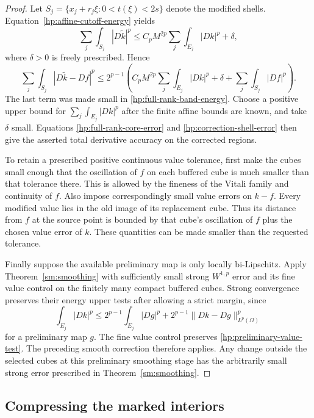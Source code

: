 \begin{proof}
Let $S_j=\{x_j+r_j\xi:0<t(\xi)<2s\}$ denote the modified shells.
Equation~\eqref{hp:affine-cutoff-energy} yields
\[
 \sum_j\int_{S_j}|D\widetilde k|^p
 \leq C_pM^{2p}\sum_j\int_{E_j}|Dk|^p+\delta,
\]
where $\delta>0$ is freely prescribed.  Hence
\begin{equation}\label{hp:correction-shell-error}
 \sum_j\int_{S_j}|D\widetilde k-Df|^p
 \leq2^{p-1}\left(
 C_pM^{2p}\sum_j\int_{E_j}|Dk|^p+\delta
 +\sum_j\int_{S_j}|Df|^p\right).
\end{equation}
The last term was made small in
\eqref{hp:full-rank-band-energy}.  Choose a positive upper bound
for $\sum_j\int_{E_j}|Dk|^p$ after the finite affine bounds are
known, and take $\delta$ small.  Equations
\eqref{hp:full-rank-core-error} and
\eqref{hp:correction-shell-error} then give the asserted total
derivative accuracy on the corrected regions.

To retain a prescribed positive continuous value tolerance, first
make the cubes small enough that the oscillation of $f$ on each
buffered cube is much smaller than that tolerance there.  This is
allowed by the fineness of the Vitali family and continuity of $f$.
Also impose correspondingly small value errors on $k-f$.
Every modified value lies in the old image of its replacement cube.
Thus its distance from $f$ at the source point is bounded by that
cube's oscillation of $f$ plus the chosen value error of $k$.
These quantities can be made smaller than the requested tolerance.

Finally suppose the available preliminary map is only locally
bi-Lipschitz.  Apply Theorem~\ref{sm:smoothing} with sufficiently
small strong $W^{1,p}$ error and its fine value control on the
finitely many compact buffered cubes.  Strong convergence preserves
their energy upper tests after allowing a strict margin, since
\[
 \int_{E_j}|Dk|^p
 \leq2^{p-1}\int_{E_j}|Dg|^p
      +2^{p-1}\|Dk-Dg\|_{L^p(\Omega)}^p
\]
for a preliminary map $g$.  The fine value control preserves
\eqref{hp:preliminary-value-test}.  The preceding smooth correction
therefore applies.  Any change outside the selected cubes at this
preliminary smoothing stage has the arbitrarily small strong error
prescribed in Theorem~\ref{sm:smoothing}.
\end{proof}

\subsection{Compressing the marked interiors}

